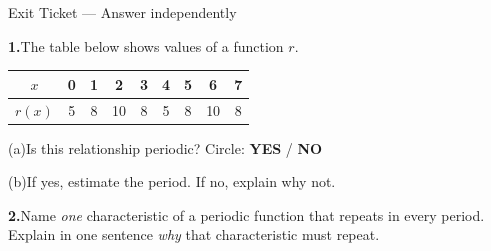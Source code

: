 \documentclass[10pt]{article}
\begin{document}
\namedateperiod

\vspace{0.10in}

\begin{notesbox}{Exit Ticket --- Answer independently}

\textbf{1.}\quad The table below shows values of a function $r$.

\vspace{4pt}
\begin{center}
\renewcommand{\arraystretch}{1.4}
\begin{tabular}{|c|c|c|c|c|c|c|c|c|}
\hline
$x$ & 0 & 1 & 2 & 3 & 4 & 5 & 6 & 7 \\
\hline
$r(x)$ & 5 & 8 & 10 & 8 & 5 & 8 & 10 & 8 \\
\hline
\end{tabular}
\end{center}

\vspace{6pt}
(a)\quad Is this relationship periodic? Circle: \textbf{YES} \quad / \quad \textbf{NO}

\vspace{4pt}
(b)\quad If yes, estimate the period. If no, explain why not.


\vspace{0.12in}
\textbf{2.}\quad Name \emph{one} characteristic of a periodic function that
repeats in every period. Explain in one sentence \emph{why} that
characteristic must repeat.


\end{notesbox}
\end{document}
